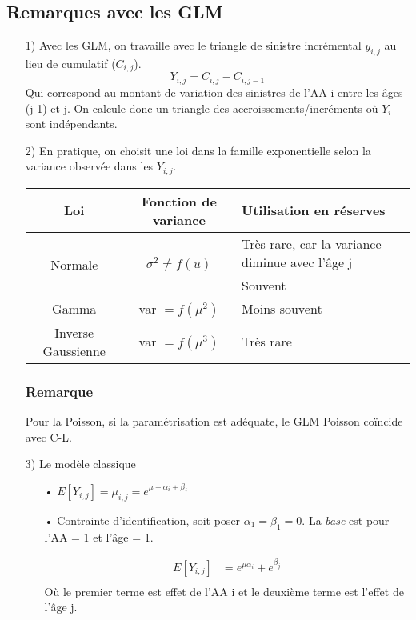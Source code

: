 \subsection*{Remarques avec les GLM}
\begin{itemize}
\item[1)] Avec les GLM, on travaille avec le triangle de sinistre incrémental $y_{i,j}$ au lieu de cumulatif ($C_{i,j}$).
$$ Y_{i,j} = C_{i,j} - C_{i,j-1}$$
Qui correspond au montant de variation des sinistres de l'AA i entre les âges (j-1) et j.
On calcule donc un triangle des accroissements/incréments où $Y_i$ sont indépendants. 
\item[2)] En pratique, on choisit une loi dans la famille exponentielle selon la variance observée dans les $Y_{i,j}$.
\bigskip

\begin{center}
\begin{tabularx}{\textwidth}{|c|c|X|}
  \hline
   Loi & Fonction de variance & Utilisation en réserves  \\
  \hline
  \multirow{2}{*}{Normale} & \multirow{2}{*}{$\sigma^2 \neq f(u)$} & Très rare, car la variance diminue avec l'âge j \\
  Poisson & $\mu$ & Souvent \\
  Gamma & var $ = f(\mu^2)$ & Moins souvent \\
  Inverse Gaussienne & var $ = f(\mu^3)$ & Très rare  \\
  \hline
\end{tabularx}
\end{center}
\subsubsection*{Remarque}
Pour la Poisson, si la paramétrisation est adéquate, le GLM Poisson coïncide  avec C-L.

\item[3)] Le modèle classique
\begin{itemize}
\item[•] $E[Y_{i,j}] = \mu_{i,j} = e^{\mu + \alpha_i + \beta_j}$
\item[•] Contrainte d'identification, soit poser $\alpha_1 = \beta_1 = 0$. La \textit{base} est pour l'AA = 1 et l'âge = 1.

\begin{align*}
E[Y_{i,j}] &= e^{\mu \alpha_i} + e^{\beta_j} \\
\end{align*}
Où le premier terme est effet de l'AA i et le deuxième terme est l'effet de l'âge j.
\end{itemize}


\end{itemize}
